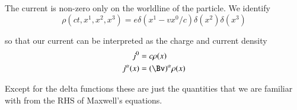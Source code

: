 The current is non-zero only on the worldline of the particle.  We identify
%
\begin{equation}\label{eqn:relativisticElectrodynamicsL12b:550}
\rho(ct, x^1, x^2, x^3) = e \delta(x^1 - v x^0/c) \delta(x^2) \delta(x^3)
\end{equation}

so that our current can be interpreted as the charge and current density
%
\begin{equation}\label{eqn:relativisticElectrodynamicsL12b:570}
\begin{aligned}
j^0 &= c \rho(x) \\
j^\alpha(x) &= (\Bv)^\alpha \rho(x)
\end{aligned}
\end{equation}

Except for the delta functions these are just the quantities that we are familiar with from the RHS of Maxwell's equations.
